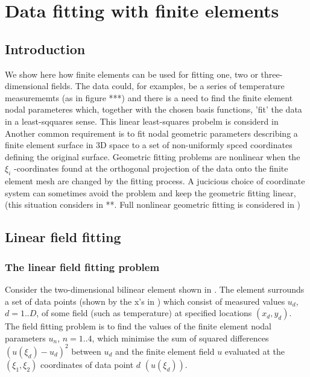 
\chapter{Data fitting with finite elements}
\label{cha:datafitting}


\section{Introduction}

We show here how finite elements can be used for fitting one, two or
three-dimensional fields. The data could, for examples, be a series of
temperature measurememts (as in figure ***) and there is a need to find the
finite element nodal parameteres which, together with the chosen basis
functions, 'fit' the data in a least-sqquares sense. This linear least-squares
probelm is considerd in  Another common
requirement is to fit nodal geometric parameters describing a finite element
surface in 3D space to a set of non-uniformly spced coordinates defining the
original surface. Geometric fitting problems are nonlinear when the $\xi_i$
-coordinates found at the orthogonal projection of the data onto the finite
element mesh are changed by the fitting process. A jucicious choice of
coordinate system can sometimes avoid the problem and keep the geometric
fitting linear, (this situation considers in **\secref{}. Full nonlinear
geometric fitting is considered in \secref)




\section{Linear field fitting}
\label{sec:linearfieldfitting}

\subsection{The linear field fitting problem}

Consider the two-dimensional bilinear element shown in
. The element surrounds a set of data points (shown by
the x's in ) which consist of measured values $u_{d}$,
$d=1..D$, of some field (such as temperature) at specified locations $(x_{d},
y_{d})$. The field fitting problem is to find the values of the finite element
nodal parameters $u_{n}$, $n=1..4$, which minimise the sum of squared
differences $(u(\xi_{d})-u_{d})^{2}$ between $u_{d}$ and the finite element
field $u$ evaluated at the $(\xi_{1},\xi_{2})$ coordinates of data point $d$ 
$(u(\xi_{d}))$.

